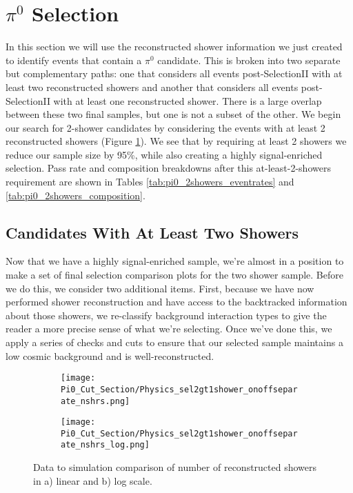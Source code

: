 \clearpage
\section{$\pi^0$ Selection} 

In this section we will use the reconstructed shower information we just created to identify events that contain a $\pi^0$ candidate. This is broken into two separate but complementary paths: one that considers all events post-SelectionII with at least two reconstructed showers and another that considers all events post-SelectionII with at least one reconstructed shower. There is a large overlap between these two final samples, but one is not a subset of the other.  
We begin our search for 2-shower candidates by considering the events with at least 2 reconstructed showers (Figure \ref{fig:physics_pi0_nshrs}).  We see that by requiring at least 2 showers we reduce our sample size by 95\%, while also creating a highly signal-enriched selection. Pass rate and composition breakdowns after this at-least-2-showers requirement are shown in Tables \ref{tab:pi0_2showers_eventrates} and \ref{tab:pi0_2showers_composition}. 

\subsection{Candidates With At Least Two Showers}
Now that we have a highly signal-enriched sample, we're almost in a position to make a set of final selection comparison plots for the two shower sample.  Before we do this, we consider two additional items. First, because we have now performed shower reconstruction and have access to the backtracked information about those showers, we re-classify background interaction types to give the reader a more precise sense of what we're selecting. Once we've done this, we apply a series of checks and cuts to ensure that our selected sample maintains a low cosmic background and is well-reconstructed.

\begin{figure}[H]
\centering
  \begin{subfigure}[t]{0.3\textwidth}
    \centering
\texttt{[image: Pi0\_Cut\_Section/Physics\_sel2gt1shower\_onoffseparate\_nshrs.png]}
  \caption{ }
  \end{subfigure} 
  \hspace{30mm}
  \begin{subfigure}[t]{0.3\textwidth}
    \centering
    \texttt{[image: Pi0\_Cut\_Section/Physics\_sel2gt1shower\_onoffseparate\_nshrs\_log.png]}
  \caption{ }
  \end{subfigure} 
\caption{ Data to simulation comparison of number of reconstructed showers in a) linear and b) log scale. }
\label{fig:physics_pi0_nshrs}
\end{figure}


